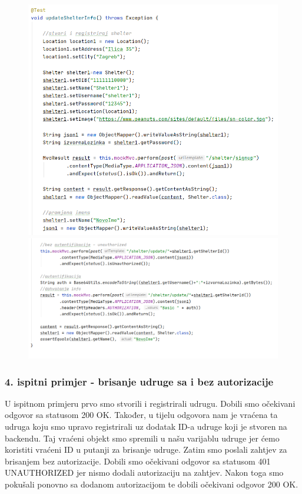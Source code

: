 			\begin{figure}[H]
				\hspace*{-0.5in}
				\includegraphics[scale=0.73]{slike/shelter3.1.PNG}
				\hspace*{-0.45in}	
				\includegraphics[scale=0.73]{slike/shelter3.2.PNG} %
				\centering
			\end{figure}
			
			
			\subsubsection{4. ispitni primjer - brisanje udruge sa i bez autorizacije }
			
			U ispitnom primjeru prvo smo stvorili i registrirali  udrugu. Dobili smo očekivani odgovor sa statusom 200 OK. Također, u tijelu odgovora nam je vraćena ta udruga koju smo upravo registrirali uz dodatak ID-a udruge koji je stvoren na backendu. Taj vraćeni objekt smo spremili u našu varijablu udruge jer ćemo koristiti vraćeni ID u putanji za brisanje udruge. Zatim smo poslali zahtjev za brisanjem bez autorizacije. Dobili smo očekivani odgovor sa statusom 401 UNAUTHORIZED jer nismo dodali autorizaciju na zahtjev. Nakon toga smo pokušali ponovno sa dodanom autorizacijom te dobili očekivani odgovor 200 OK.
			
